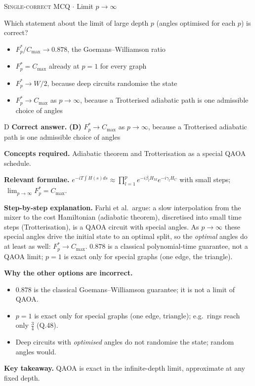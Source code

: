 \documentclass[11pt,a4paper]{article}
\newcommand{\optlabel}[1]{\textbf{(#1)}}
\newcommand{\correctlabel}[1]{\textcolor{okgreen}{\textbf{(#1)}\,\ding{51}}}
\newenvironment{qitem}[1]{\begin{list}{}{\setlength{\leftmargin}{3.3em}\setlength{\labelwidth}{3.1em}%
  \setlength{\labelsep}{0.2em}\setlength{\topsep}{3pt}\setlength{\parsep}{3pt}}\item[\textbf{Q.#1}\hfill]}{\end{list}}
\newcommand{\qsep}{\par\vspace{2pt}{\color{black!15}\hrule}\vspace{4pt}}
\newcommand{\qmeta}[2]{{\footnotesize\color{black!60}\textsc{#1} \;$\cdot$\; #2}\par}
\begin{document}
\begin{qitem}{50}
\qmeta{Single-correct MCQ}{Limit $p \to \infty$}
Which statement about the limit of large depth $p$ (angles optimised for each $p$) is correct?
\begin{itemize}[leftmargin=2.6em, labelsep=0.4em, itemsep=2pt, topsep=3pt]
\item[\optlabel{A}] $F_p^*/C_{\max} \to 0.878$, the Goemans--Williamson ratio
\item[\optlabel{B}] $F_p^* = C_{\max}$ already at $p = 1$ for every graph
\item[\optlabel{C}] $F_p^* \to W/2$, because deep circuits randomise the state
\item[\correctlabel{D}] $F_p^* \to C_{\max}$ as $p \to \infty$, because a Trotterised adiabatic path is one admissible choice of angles
\end{itemize}
\end{qitem}
\begin{solbox}{D}
\textbf{\color{brand}Correct answer.} \textcolor{okgreen}{\textbf{(D)}} $F_p^* \to C_{\max}$ as $p \to \infty$, because a Trotterised adiabatic path is one admissible choice of angles

\textbf{\color{brand}Concepts required.} Adiabatic theorem and Trotterisation as a special QAOA schedule.

\textbf{\color{brand}Relevant formulae.} $e^{-iT\int H(s)ds} \approx \prod_{l=1}^{p} e^{-i\beta_lH_M}e^{-i\gamma_lH_C}$ with small steps; $\ \lim_{p\to\infty}F_p^* = C_{\max}$.

\textbf{\color{brand}Step-by-step explanation.} Farhi et al.\ argue: a slow interpolation from the mixer to the cost Hamiltonian (adiabatic theorem), discretised into
small time steps (Trotterisation), is a QAOA circuit with special angles. As $p \to \infty$ these special angles drive the
initial state to an optimal split, so the \emph{optimal} angles do at least as well: $F_p^* \to C_{\max}$.
$0.878$ is a classical polynomial-time guarantee, not a QAOA limit; $p = 1$ is exact only for special graphs (one edge, the
triangle).

\textbf{\color{brand}Why the other options are incorrect.}
\begin{itemize}[leftmargin=2.4em, itemsep=1pt, topsep=2pt]
\item[\textbf{(A)}] $0.878$ is the classical Goemans--Williamson guarantee; it is not a limit of QAOA.
\item[\textbf{(B)}] $p = 1$ is exact only for special graphs (one edge, triangle); e.g.\ rings reach only $\frac34$ (Q.48).
\item[\textbf{(C)}] Deep circuits with \emph{optimised} angles do not randomise the state; random angles would.
\end{itemize}
\textbf{\color{brand}Key takeaway.} QAOA is exact in the infinite-depth limit, approximate at any fixed depth.
\end{solbox}
\qsep
\end{document}
